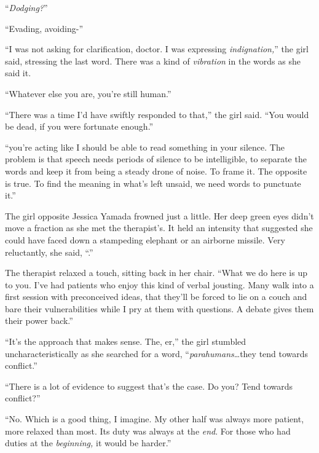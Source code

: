 ``\emph{Dodging?}''



``Evading, avoiding-''



``I was not asking for clarification, doctor.  I was expressing \emph{indignation,}'' the girl said, stressing the last word.  There was a kind of \emph{vibration} in the words as she said it.



``Whatever else you are, you're still human.''



``There was a time I'd have swiftly responded to that,'' the girl said.  ``You would be dead, if you were fortunate enough.''



``\ldotsAnd you're acting like I should be able to read something in your silence.  The problem is that speech needs periods of silence to be intelligible, to separate the words and keep it from being a steady drone of noise.  To frame it.  The opposite is true.  To find the meaning in what's left unsaid, we need words to punctuate it.''



The girl opposite Jessica Yamada frowned just a little.  Her deep green eyes didn't move a fraction as she met the therapist's.  It held an intensity that suggested she could have faced down a stampeding elephant or an airborne missile.  Very reluctantly, she said, ``\ldotsFair.''



The therapist relaxed a touch, sitting back in her chair.  ``What we do here is up to you.  I've had patients who enjoy this kind of verbal jousting.  Many walk into a first session with preconceived ideas, that they'll be forced to lie on a couch and bare their vulnerabilities while I pry at them with questions.  A debate gives them their power back.''



``It's the approach that makes sense.  The, er,'' the girl stumbled uncharacteristically as she searched for a word, ``\emph{parahumans}\ldots they tend towards conflict.''



``There is a lot of evidence to suggest that's the case.  Do you?  Tend towards conflict?''



``No.  Which is a good thing, I imagine.  My other half was always more patient, more relaxed than most.  Its duty was always at the \emph{end}.  For those who had duties at the \emph{beginning, }it would be harder.''




